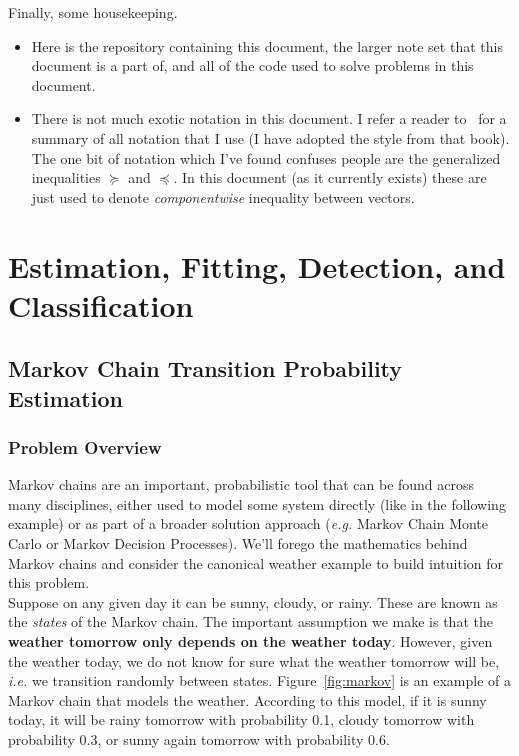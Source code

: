 \documentclass[12pt,reqno]{article}
\theoremstyle{definition}
\numberwithin{equation}{section}
\begin{document}
\vspace{0.2cm}
\noindent Finally, some housekeeping.
\begin{itemize}
    \item Here is the repository containing this document, the larger note set that this document is a part of,
    and all of the code used to solve problems in this document.
    \item There is not much exotic notation in this document. I refer a reader to~\cite{boyd_convex_optimization}
    for a summary of all notation that I use (I have adopted the style from that book). The one bit of notation
    which I've found confuses people are the generalized inequalities $\succeq$ and $\preceq$. In this document
    (as it currently exists) these are just used to denote \textit{componentwise} inequality between vectors.
\end{itemize}



\newpage

\section{Estimation, Fitting, Detection, and Classification}

\subsection{Markov Chain Transition Probability Estimation}

\subsubsection*{Problem Overview}

Markov chains are an important, probabilistic tool that can be found across many disciplines,
either used to model some system directly (like in the following example) or as part of a broader solution
approach (\textit{e.g.} Markov Chain Monte Carlo or Markov Decision Processes). We'll forego the mathematics behind Markov chains and consider the canonical weather example
to build intuition for this problem.\\
\noindent Suppose on any given day it can be sunny, cloudy, or rainy. These are known as the \textit{states}
of the Markov chain. 
The important assumption we make is that the \textbf{weather tomorrow only depends on the weather today}.
However, given the weather today, we do not know for sure what the weather tomorrow will be, \textit{i.e.} we transition
randomly between states. Figure~\ref{fig:markov} is an example of a Markov chain that models the weather. According to this model,
if it is sunny today, it will be rainy tomorrow with probability 0.1, cloudy tomorrow with probability 0.3,
or sunny again tomorrow with probability 0.6.  
\end{document}
